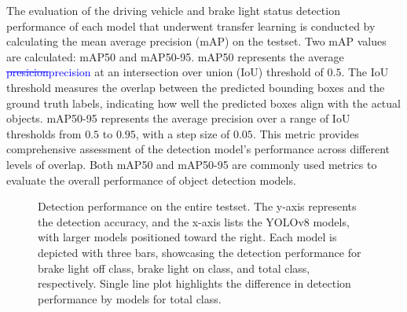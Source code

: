 The evaluation of the driving vehicle and brake light status detection performance of each model that underwent transfer learning is conducted by calculating the mean average precision (mAP) on the testset.
Two mAP values are calculated: mAP50 and mAP50-95.
mAP50 represents the average \textcolor{blue}{ \sout{presicion}precision} at an intersection over union (IoU) threshold of $0.5$. The IoU threshold measures the overlap between the predicted bounding boxes and the ground truth labels, indicating how well the predicted boxes align with the actual objects.
mAP50-95 represents the average precision over a range of IoU thresholds from $0.5$ to $0.95$, with a step size of $0.05$. 
This metric provides comprehensive assessment of the detection model's performance across different levels of overlap.
Both mAP50 and mAP50-95 are commonly used metrics to evaluate the overall performance of object detection models.

\begin{figure}[t]%


\caption{Detection performance on the entire testset. The y-axis represents the detection accuracy, and the x-axis lists the YOLOv8 models, with larger models positioned toward the right. Each model is depicted with three bars, showcasing the detection performance for brake light off class, brake light on class, and total class, respectively. Single line plot highlights the difference in detection performance by models for total class.}
\label{fig:test_results}%
\end{figure}



